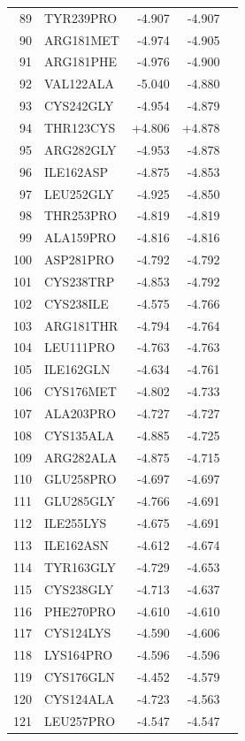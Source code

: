 \begin{longtable}{r l r r c}
89 & TYR239PRO & -4.907 & -4.907 &  \\
90 & ARG181MET & -4.974 & -4.905 &  \\
91 & ARG181PHE & -4.976 & -4.900 &  \\
92 & VAL122ALA & -5.040 & -4.880 &  \\
93 & CYS242GLY & -4.954 & -4.879 &  \\
94 & THR123CYS & +4.806 & +4.878 &  \\
95 & ARG282GLY & -4.953 & -4.878 &  \\
96 & ILE162ASP & -4.875 & -4.853 &  \\
97 & LEU252GLY & -4.925 & -4.850 &  \\
98 & THR253PRO & -4.819 & -4.819 &  \\
99 & ALA159PRO & -4.816 & -4.816 &  \\
100 & ASP281PRO & -4.792 & -4.792 &  \\
101 & CYS238TRP & -4.853 & -4.792 &  \\
102 & CYS238ILE & -4.575 & -4.766 &  \\
103 & ARG181THR & -4.794 & -4.764 &  \\
104 & LEU111PRO & -4.763 & -4.763 &  \\
105 & ILE162GLN & -4.634 & -4.761 &  \\
106 & CYS176MET & -4.802 & -4.733 &  \\
107 & ALA203PRO & -4.727 & -4.727 &  \\
108 & CYS135ALA & -4.885 & -4.725 &  \\
109 & ARG282ALA & -4.875 & -4.715 &  \\
110 & GLU258PRO & -4.697 & -4.697 &  \\
111 & GLU285GLY & -4.766 & -4.691 &  \\
112 & ILE255LYS & -4.675 & -4.691 &  \\
113 & ILE162ASN & -4.612 & -4.674 &  \\
114 & TYR163GLY & -4.729 & -4.653 &  \\
115 & CYS238GLY & -4.713 & -4.637 &  \\
116 & PHE270PRO & -4.610 & -4.610 &  \\
117 & CYS124LYS & -4.590 & -4.606 &  \\
118 & LYS164PRO & -4.596 & -4.596 &  \\
119 & CYS176GLN & -4.452 & -4.579 &  \\
120 & CYS124ALA & -4.723 & -4.563 &  \\
121 & LEU257PRO & -4.547 & -4.547 &  \\

\end{longtable}
